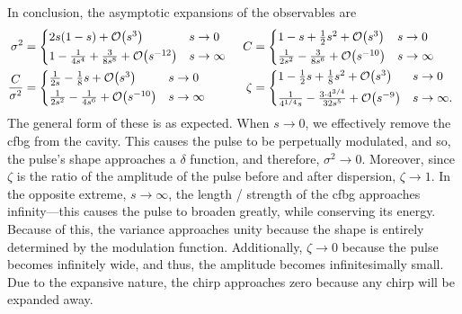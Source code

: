 In conclusion, the asymptotic expansions of the observables are
\begin{equation}
\begin{aligned}
\sigma^2 &=
\begin{cases*}
2s(1 - s) + \bigO{s^3} & $s \rightarrow 0$ \\
1 - \frac{1}{4s^4} + \frac{3}{8s^8} + \bigO{s^{-12}} & $s \rightarrow \infty$
\end{cases*}
& C &=
\begin{cases*}
1 - s + \frac{1}{2}s^2 + \bigO{s^3} & $s \rightarrow 0$ \\
\frac{1}{2s^2} - \frac{3}{8s^6} + \bigO{s^{-10}} & $s \rightarrow \infty$
\end{cases*} \\
\frac{C}{\sigma^2} &=
\begin{cases*}
\frac{1}{2s} - \frac{1}{8}s + \bigO{s^3} & $s \rightarrow 0$ \\
\frac{1}{2s^2} - \frac{1}{4s^6} + \bigO{s^{-10}} & $s \rightarrow \infty$
\end{cases*}
& \zeta &=
\begin{cases*}
1 - \frac{1}{2}s + \frac{1}{8}s^2 + \bigO{s^3} & $s \rightarrow 0$ \\
\frac{1}{4^{1/4}s} - \frac{3 \cdot 4^{3/4}}{32 s^5} + \bigO{s^{-9}} & $s \rightarrow \infty$.
\end{cases*}
\label{eq:asympt}
\end{aligned}
\end{equation}
The general form of these is as expected. When $s \rightarrow 0$, we effectively remove the \gls{cfbg} from the cavity. This causes the pulse to be perpetually modulated, and so, the pulse's shape approaches a $\delta$ function, and therefore, $\sigma^2 \rightarrow 0$. Moreover, since $\zeta$ is the ratio of the amplitude of the pulse before and after dispersion, $\zeta \rightarrow 1$. In the opposite extreme, $s \rightarrow \infty$, the length / strength of the \gls{cfbg} approaches infinity---this causes the pulse to broaden greatly, while conserving its energy. Because of this, the variance approaches unity because the shape is entirely determined by the modulation function. Additionally, $\zeta \rightarrow 0$ because the pulse becomes infinitely wide, and thus, the amplitude becomes infinitesimally small. Due to the expansive nature, the chirp approaches zero because any chirp will be expanded away. \\
